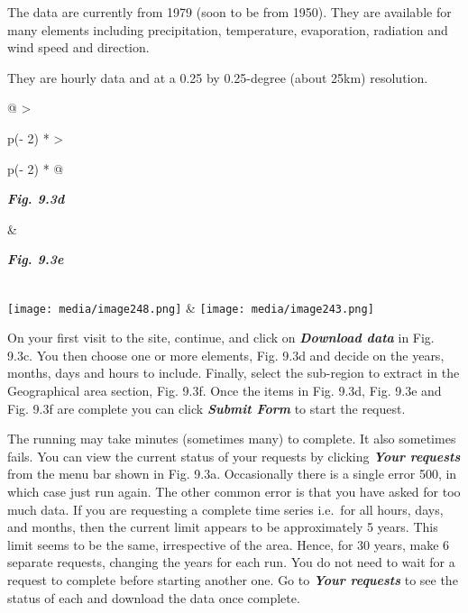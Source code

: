 \documentclass[
  letterpaper,
  DIV=11,
  numbers=noendperiod]{scrreprt}
\begin{document}
The data are currently from 1979 (soon to be from 1950). They are
available for many elements including precipitation, temperature,
evaporation, radiation and wind speed and direction.

They are hourly data and at a 0.25 by 0.25-degree (about 25km)
resolution.

\begin{longtable}[]{@{}
  >{\raggedright\arraybackslash}p{(\columnwidth - 2\tabcolsep) * }
  >{\raggedright\arraybackslash}p{(\columnwidth - 2\tabcolsep) * }@{}}
\toprule\noalign{}
\begin{minipage}[b]{\linewidth}\raggedright
\textbf{\emph{Fig. 9.3d}}
\end{minipage} & \begin{minipage}[b]{\linewidth}\raggedright
\textbf{\emph{Fig. 9.3e}}
\end{minipage} \\
\midrule\noalign{}
\endhead
\bottomrule\noalign{}
\endlastfoot
\texttt{[image: media/image248.png]} &
\texttt{[image: media/image243.png]} \\
\end{longtable}

On your first visit to the site, continue, and click on
\textbf{\emph{Download data}} in Fig. 9.3c. You then choose one or more
elements, Fig. 9.3d and decide on the years, months, days and hours to
include. Finally, select the sub-region to extract in the Geographical
area section, Fig. 9.3f. Once the items in Fig. 9.3d, Fig. 9.3e and Fig.
9.3f are complete you can click \textbf{\emph{Submit Form}} to start the
request.

The running may take minutes (sometimes many) to complete. It also
sometimes fails. You can view the current status of your requests by
clicking \textbf{\emph{Your requests}} from the menu bar shown in Fig.
9.3a. Occasionally there is a single error 500, in which case just run
again. The other common error is that you have asked for too much data.
If you are requesting a complete time series i.e.~for all hours, days,
and months, then the current limit appears to be approximately 5 years.
This limit seems to be the same, irrespective of the area. Hence, for 30
years, make 6 separate requests, changing the years for each run. You do
not need to wait for a request to complete before starting another one.
Go to \textbf{\emph{Your requests}} to see the status of each and
download the data once complete.
\end{document}

